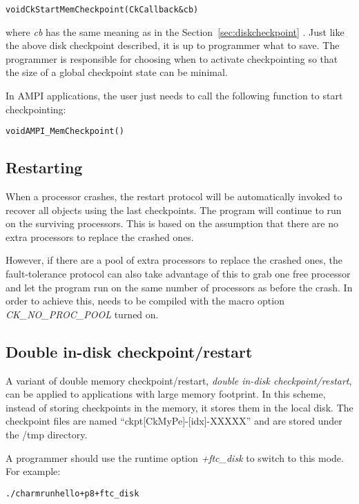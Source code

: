 \begin{alltt}
      void CkStartMemCheckpoint(CkCallback &cb)
\end{alltt}

where {\it cb} has the same meaning as in the Section~\ref{sec:diskcheckpoint} .
Just like the above disk checkpoint described, it is up to programmer what to save.
The programmer is responsible for choosing when to activate checkpointing so that
the size of a global checkpoint state can be minimal.

In AMPI applications, the user just needs to call the following function to 
start checkpointing:

\begin{alltt}
      void AMPI_MemCheckpoint()
\end{alltt}

\subsection{Restarting}

When a processor crashes, the restart protocol will be automatically
invoked to recover all objects using the last checkpoints. The program
will continue to run on the surviving processors. This is based on the assumption
that there are no extra processors to replace the crashed ones. 

However, if there are a pool of extra processors to replace the crashed ones, 
the fault-tolerance protocol can also take advantage of this to grab one
free processor and let the program run on the same number of processors 
as before the crash. 
In order to achieve this, \charmpp{} needs to be compiled with the macro option
 {\it CK\_NO\_PROC\_POOL} turned on.

\subsection{Double in-disk checkpoint/restart}

A variant of double memory checkpoint/restart,
{\it double in-disk checkpoint/restart},
can be applied to applications with large memory footprint.
In this scheme, instead of storing checkpoints in the memory, it stores 
them in the local disk.
The checkpoint files are named ``ckpt[CkMyPe]-[idx]-XXXXX'' and are stored under the /tmp directory.

A programmer should use the runtime option {\it +ftc\_disk} to switch to this mode.
For example:

\begin{alltt}
   ./charmrun hello +p8 +ftc_disk
\end{alltt} 

